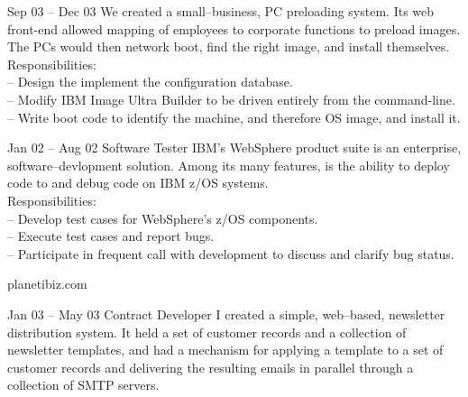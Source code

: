 \documentclass[letterpaper, 11pt]{article}
\begin{document}
\begin{resume}
\begin{block}
\begin{subcategory}{Sep 03 -- Dec 03}
                We created a small--business, PC preloading system.  Its web front-end allowed
                mapping of employees to corporate functions to preload images.  The PCs would
                then network boot, find the right image, and install themselves.
                \\[1ex]
                Responsibilities: \\
                -- Design the implement the configuration database. \\
                -- Modify IBM Image Ultra Builder to be driven entirely from the command-line. \\
                -- Write boot code to identify the machine, and therefore OS image, and install it.
                \bigskip
            \end{subcategory}
            \begin{subcategory}{Jan 02 -- Aug 02}
                 {Software Tester}
                IBM's WebSphere product suite is an enterprise, software--devlopment solution.  Among
                its many features, is the ability to deploy code to and debug code on IBM z/OS systems.
                \\[1ex]
                Responsibilities: \\
                -- Develop test cases for WebSphere's z/OS components. \\
                -- Execute test cases and report bugs. \\
                -- Participate in frequent call with development to discuss and clarify bug status.
                \bigskip
                \bigskip
            \end{subcategory}
        \end{block}
        \begin{block}
            \begin{category}{planetibiz.com}
                  {}
                \smallskip
            \end{category}
            \begin{subcategory}{Jan 03 -- May 03}
                 {Contract Developer}
                I created a simple, web--based, newsletter distribution system.
                It held a set of customer records and a collection of newsletter templates,
                and had a mechanism for applying a template to a set of customer records and
                delivering the resulting emails in parallel through a collection of SMTP servers.

\end{subcategory}
\end{block}
\end{resume}
\end{document}
